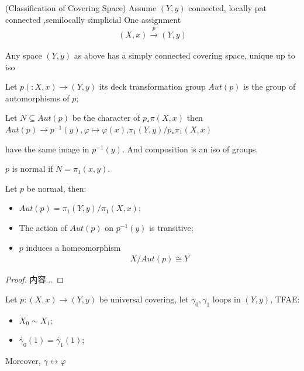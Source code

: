\documentclass[Total.tex]{subfiles}
\begin{document}
\begin{proposition}
		\begin{proposition}
			(Classification of Covering Space) Assume $(Y,y)$ connected, locally pat connected ,semilocally simplicial 
			One assignment
			\begin{gather*}
				(X,x)\stackrel{p}{\rightarrow} (Y,y)
			\end{gather*}
		\end{proposition}
		
		\begin{corollary}
			Any space $(Y,y)$ as above has a simply connected covering space, unique up to iso
		\end{corollary}
		
		\begin{Def}
			Let $p(:X,x)\rightarrow (Y,y)$ its deck transformation group $Aut(p)$ is the group of automorphisms of $p$;
		\end{Def}
		
		\begin{proposition}
			Let $N\subseteq Aut(p)$ be the character of $p_*\pi(X,x)$ then $Aut(p)\rightarrow p^{-1}(y),\varphi\mapsto \varphi(x)$,$\pi_1(Y,y)/p_*\pi_1(X,x)$
		\end{proposition}
		have the same image in $p^{-1}(y)$. And composition is an iso of groups.
	\end{proposition}
	\begin{Def}
		$p$ is normal if $N=\pi_1(x,y)$.
	\end{Def}
	
	\begin{corollary}
		Let $p$ be normal, then:
		\begin{itemize}
			\item $Aut(p)=\pi_1(Y,y)/\pi_1(X,x)$;
			\item The action of $Aut(p)$ on $p^{-1}(y)$ is transitive;
			\item $p$ induces a homeomorphism
			\begin{gather*}
				X/Aut(p)\cong Y
			\end{gather*}
		\end{itemize}
	\end{corollary}
	\begin{proof}
		内容...
	\end{proof}
	
	\begin{corollary}
		Let $p:(X,x)\rightarrow (Y,y)$ be universal covering, let $\gamma_0,\gamma_1$ loops in $(Y,y)$, TFAE:
		\begin{itemize}
			\item $X_0\sim X_1$;
			\item $\dot{\gamma_0}(1)=\dot{\gamma_1}(1)$;
		\end{itemize}
		Moreover, $\gamma\leftrightarrow \varphi$
	\end{corollary}
\end{document}
